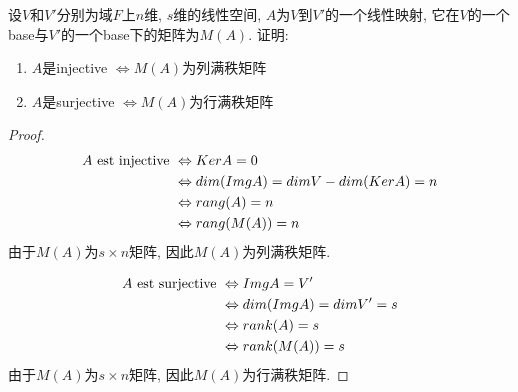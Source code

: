 \begin{example}
设$V$和$V'$分别为域$F$上$n$维, $s$维的线性空间, $A$为$V$到$V'$的一个线性映射, 它在$V$的一个base与$V'$的一个base下的矩阵为$M(A)$.
证明:
\begin{enumerate}
\item $A$是injective $\Leftrightarrow M(A)$为列满秩矩阵
\item $A$是surjective $\Leftrightarrow M(A)$为行满秩矩阵
\end{enumerate}
\end{example}
\begin{proof}
$$
\begin{aligned}
A \text{ est injective } & \Leftrightarrow Ker A = 0 \\
& \Leftrightarrow dim(Img A) = dim V - dim(Ker A) = n \\
& \Leftrightarrow rang(A) = n \\
& \Leftrightarrow rang(M(A)) = n
\end{aligned}
$$
由于$M(A)$为$s \times n$矩阵, 因此$M(A)$为列满秩矩阵.

$$
\begin{aligned}
A \text{ est surjective } & \Leftrightarrow Img A = V' \\
& \Leftrightarrow dim(Img A) = dim V' = s \\
& \Leftrightarrow rank(A) = s \\
& \Leftrightarrow rank(M(A)) = s \\
\end{aligned}
$$
由于$M(A)$为$s \times n$矩阵, 因此$M(A)$为行满秩矩阵.
\end{proof}

